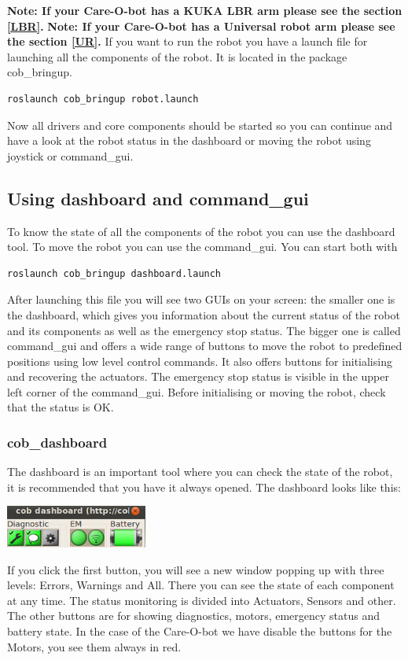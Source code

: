 \textbf{Note: If your Care-O-bot has a KUKA LBR arm please see the section \ref{LBR}.}
\textbf{Note:  If your Care-O-bot has a Universal robot arm please see the section \ref{UR}.}
If you want to run the robot you have a launch file for launching all the components of the robot. It is located in the package cob\_bringup.
\begin{lstlisting}
roslaunch cob_bringup robot.launch
\end{lstlisting}

Now all drivers and core components should be started so you can continue and have a look at the robot status in the dashboard or moving the robot using joystick or command\_gui.

\subsection{Using dashboard and command\_gui}
To know the state of all the components of the robot you can use the dashboard tool. To move the robot you can use the command\_gui. You can start both with
\begin{lstlisting}
roslaunch cob_bringup dashboard.launch
\end{lstlisting}

After launching this file you will see two GUIs on your screen: the smaller one is the dashboard, which gives you information about the current status of the robot and its components as well as the emergency stop status. The bigger one is called command\_gui and offers a wide range of buttons to move the robot to predefined positions using low level control commands. It also offers buttons for initialising and recovering the actuators. The emergency stop status is visible in the upper left corner of the command\_gui. Before initialising or moving the robot, check that the status is OK.

\subsubsection{cob\_dashboard}\label{subsec:dashboard}
The dashboard is an important tool where you can check the state of the robot, it is recommended that you have it always opened. The dashboard looks like this:

\begin{center}
\includegraphics[width=0.35\textwidth]{images/dashboard.png}
\end{center}
If you click the first button, you will see a new window popping up with three levels: Errors, Warnings and All. There you can see the state of each component at any time. The status monitoring is divided into Actuators, Sensors and other. The other buttons are for showing diagnostics, motors, emergency status and battery state. In the case of the Care-O-bot we have disable the buttons for the Motors, you see them always in red.

